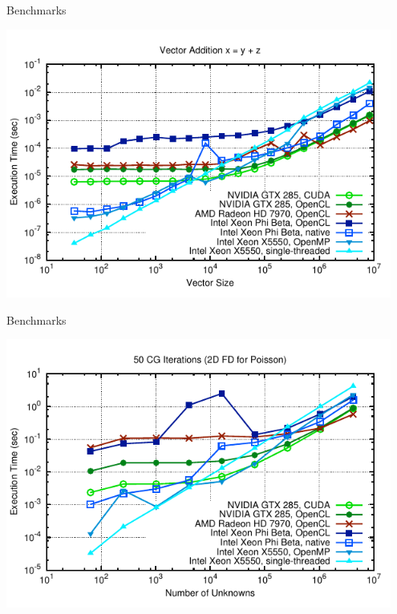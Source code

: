 


\begin{frame}{Benchmarks}
  \begin{center}
   \includegraphics[width=0.95\textwidth]{figures/vector-timings-7}
  \end{center}
\end{frame}



\begin{frame}{Benchmarks}
  \begin{center}
   \includegraphics[width=0.95\textwidth]{figures/cg-timings-7}
  \end{center}
\end{frame}






